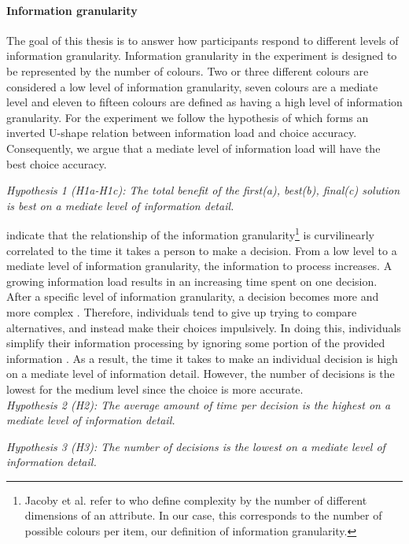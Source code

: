 \paragraph{Information granularity}
The goal of this thesis is to answer how participants respond to different levels of information granularity.
Information granularity in the experiment is designed to be represented by the number of colours. Two or three different colours are considered a low level of information granularity, seven colours are a mediate level and eleven to fifteen colours are defined as having a high level of information granularity.
For the experiment we follow the hypothesis of \cite{Jacoby1974} which forms an inverted U-shape relation between information load and choice accuracy. Consequently, we argue that a mediate level of information load will have the best choice accuracy.

\textit{Hypothesis 1 (H1a-H1c): The total benefit of the first(a), best(b), final(c) solution is best on a mediate level of information detail.}

\cite{Jacoby1974} indicate that the relationship of the information granularity\footnote{Jacoby et al. refer to \cite{Hendrick1968} who define complexity by the number of different dimensions of an attribute. In our case, this corresponds to the number of possible colours per item, our definition of information granularity. }  is curvilinearly correlated to the time it takes a person to make a decision. From a low level to a mediate level of information granularity, the information to process increases. A growing information load results in an increasing time spent on one decision. After a specific level of information granularity, a decision becomes more and more complex \citep{Hendrick1968}. Therefore, individuals tend to give up trying to compare alternatives, and instead make their choices impulsively. In doing this, individuals simplify their information processing by ignoring some portion of the provided information \citep{Malhotra1982}.
As a result, the time it takes to make an individual decision is high on a mediate level of information detail. However, the number of decisions is the lowest for the medium level since the choice is more accurate.\\ 
\textit{Hypothesis 2 (H2): The average amount of time per decision is the highest on a mediate level of information detail.}

\textit{Hypothesis 3 (H3): The number of decisions is the lowest on a mediate level of information detail.}\\

